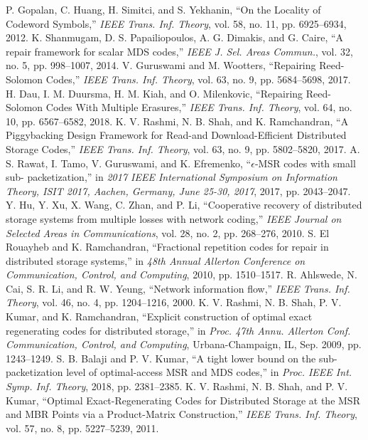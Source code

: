 \begin{multicols}{2}
\begin{thebibliography}{99}
 P. Gopalan, C. Huang, H. Simitci, and S. Yekhanin, ``On the Locality of Codeword Symbols,''  \textit{IEEE Trans. Inf. Theory}, vol. 58, no. 11, pp. 6925--6934, 2012.
 K. Shanmugam, D. S. Papailiopoulos, A. G. Dimakis, and G. Caire, ``A repair framework for scalar MDS codes,'' \textit{IEEE J. Sel. Areas Commun.}, vol. 32, no. 5, pp. 998--1007, 2014.
 V. Guruswami and M. Wootters, ``Repairing Reed-Solomon Codes,'' \textit{IEEE Trans. Inf. Theory}, vol. 63, no. 9, pp. 5684--5698, 2017.
 H. Dau, I. M. Duursma, H. M. Kiah, and O. Milenkovic, ``Repairing Reed-Solomon Codes With Multiple Erasures,'' \textit{IEEE Trans. Inf. Theory}, vol. 64, no. 10, pp. 6567--6582, 2018.
 K. V. Rashmi, N. B. Shah, and K. Ramchandran, ``A Piggybacking Design Framework for Read-and Download-Efficient Distributed Storage Codes,'' \textit{IEEE Trans. Inf. Theory}, vol. 63, no. 9, pp. 5802--5820, 2017.
 A. S. Rawat, I. Tamo, V. Guruswami, and K. Efremenko, ``$\epsilon$-MSR codes with small sub-
packetization,'' in \textit{2017 IEEE International Symposium on Information Theory, ISIT 2017, Aachen, Germany, June 25-30, 2017}, 2017, pp. 2043--2047.
 Y. Hu, Y. Xu, X. Wang, C. Zhan, and P. Li, ``Cooperative recovery of distributed storage systems from multiple losses with network coding,'' \textit{IEEE Journal on Selected Areas in Communications}, vol. 28, no. 2, pp. 268--276, 2010.
 S. El Rouayheb and K. Ramchandran, ``Fractional repetition codes for repair in distributed
storage systems,'' in \textit{48th Annual Allerton Conference on Communication, Control, and Computing}, 2010, pp. 1510--1517.
 R. Ahlswede, N. Cai, S. R. Li, and R. W. Yeung, ``Network information flow,'' \textit{IEEE Trans. Inf. Theory}, vol. 46, no. 4, pp. 1204--1216, 2000.
 K. V. Rashmi, N. B. Shah, P. V. Kumar, and K. Ramchandran, ``Explicit construction of optimal exact regenerating codes for distributed storage,'' in \textit{Proc. 47th Annu. Allerton Conf. Communication, Control, and Computing}, Urbana-Champaign, IL, Sep. 2009, pp. 1243--1249.
 S. B. Balaji and P. V. Kumar, ``A tight lower bound on the sub- packetization level of optimal-access MSR and MDS codes,'' in \textit{Proc. IEEE Int. Symp. Inf. Theory}, 2018, pp. 2381--2385.
 K. V. Rashmi, N. B. Shah, and P. V. Kumar, ``Optimal Exact-Regenerating Codes for Distributed Storage at the MSR and MBR Points via a Product-Matrix Construction,'' \textit{IEEE Trans. Inf. Theory}, vol. 57, no. 8, pp. 5227--5239, 2011.

\end{thebibliography}
\end{multicols}
